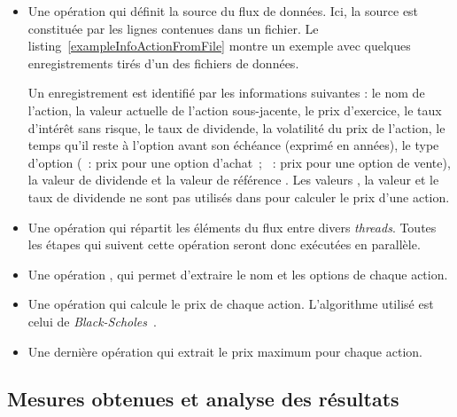 \begin{itemize}

\item Une op\'eration qui d\'efinit la source du flux de donn\'ees. Ici, la source est constitu\'ee par les lignes contenues dans un fichier. Le listing~\ref{exampleInfoActionFromFile} montre un exemple avec quelques enregistrements tir\'es d'un des fichiers de données. 

Un enregistrement est identifi\'e par les informations suivantes : le nom de l'action, la valeur actuelle de l'action sous-jacente, le prix d'exercice, le taux d'int\'er\^et sans risque, le taux de dividende, la volatilit\'e du prix de l'action, le temps qu'il reste \`a l'option avant son \'ech\'eance (exprim\'e en ann\'ees), le type d'option (~: prix pour une option d'achat~; ~: prix pour une option de vente), la valeur de dividende et la valeur de r\'ef\'erence . 
Les valeurs , la valeur et le taux de dividende ne sont pas utilis\'es dans  pour calculer le prix d'une action.

\item Une op\'eration qui r\'epartit les \'el\'ements du flux entre divers \emph{threads}.
Toutes les \'etapes qui suivent cette op\'eration seront donc ex\'ecut\'ees en parall\`ele.

\item Une op\'eration  , qui permet d'extraire le nom et les options de chaque action.


\item  Une op\'eration qui calcule le prix de chaque action. L'algorithme utilis\'e est celui de \emph{Black-Scholes}~\citep{macbeth1979empirical}. 

\item Une derni\`ere op\'eration qui extrait le prix maximum pour chaque action.


\end{itemize}

\subsection{Mesures obtenues et analyse des r\'esultats}



